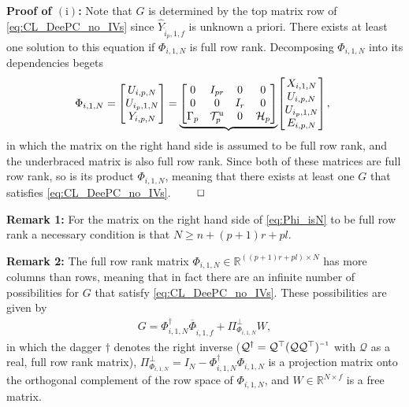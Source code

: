 \noindent\textbf{Proof of $(\mathrm{i})$:} Note that $G$ is determined by the top matrix row of \eqref{eq:CL_DeePC_no_IVs} since $\widehat{Y}_{\hat{i}_p,1,f}$ is unknown a priori. There exists at least one solution to this equation if $\Phi_{i,1,N}$ is full row rank. Decomposing $\Phi_{i,1,N}$ into its dependencies begets
\begin{align}\label{eq:Phi_isN}
    \mkern-8mu\Phi_{i,1,N}=\mkern-1mu\begin{bmatrix}
        U_{i,p,N}\\
        U_{i_p,1,N}\\
        Y_{i,p,N}
    \end{bmatrix}\mkern-1mu=\mkern-1mu
    \underbrace{\begin{bmatrix}
        0        & I_{pr} & 0      & 0\\
        0        & 0      & I_{r} & 0\\
        \Gamma_p & \mathcal{T}_p^\mathrm{u} & 0 & \mathcal{H}_p
    \end{bmatrix}}\mkern-3mu\begin{bmatrix}
        X_{i,1,N}\\
        U_{i,p,N}\\
        U_{i_p,1,N}\\
        E_{i,p,N}
    \end{bmatrix}\mkern-1mu,
\end{align}
in which the matrix on the right hand side is assumed to be full row rank, and the underbraced matrix is also full row rank. Since both of these matrices are full row rank, so is its product $\Phi_{i,1,N}$, meaning that there exists at least one $G$ that satisfies \eqref{eq:CL_DeePC_no_IVs}. $\hfill\qed$

\noindent\textbf{Remark 1:} For the matrix on the right hand side of \eqref{eq:Phi_isN} to be full row rank a necessary condition is that $N\geq n+(p+1)r+pl$.

\noindent\textbf{Remark 2:} The full row rank matrix $\Phi_{i,1,N}\in\mathbb{R}^{((p+1)r+pl)\times N}$ has more columns than rows, meaning that in fact there are an infinite number of possibilities for $G$ that satisfy \eqref{eq:CL_DeePC_no_IVs}. These possibilities are given by
\begin{align}\label{eq:G_sols}
    G = \Phi_{i,1,N}^\dagger\overline{\Phi}_{\hat{i},1,f} + \Pi_{\Phi_{i,1,N}}^\bot W,
\end{align}
in which the dagger $\dagger$ denotes the right inverse ($\mathcal{Q}^\dagger=\mathcal{Q}^\top(\mathcal{Q}\mathcal{Q}^\top)\inv$ with $\mathcal{Q}$ as a real, full row rank matrix), $\Pi_{\Phi_{i,1,N}}^\bot=I_N-\Phi_{i,1,N}^\dagger\Phi_{i,1,N}$ is a projection matrix onto the orthogonal complement of the row space of $\Phi_{i,1,N}$, %
and $W\in\mathbb{R}^{N\times f}$ is a free matrix.

